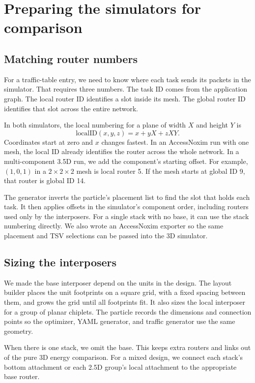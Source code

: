 \documentclass[12pt,a4paper]{article}
\begin{document}
\clearpage
\section{Preparing the simulators for comparison}

\subsection{Matching router numbers}

For a traffic-table entry, we need to know where each task sends its packets in the simulator. That requires three numbers. The task ID comes from the application graph. The local router ID identifies a slot inside its mesh. The global router ID identifies that slot across the entire network.

In both simulators, the local numbering for a plane of width \(X\) and height \(Y\) is
\[
\mathrm{localID}(x,y,z)=x+yX+zXY.
\]
Coordinates start at zero and \(x\) changes fastest. In an AccessNoxim run with one mesh, the local ID already identifies the router across the whole network. In a multi-component 3.5D run, we add the component's starting offset. For example, \((1,0,1)\) in a \(2\times2\times2\) mesh is local router 5. If the mesh starts at global ID 9, that router is global ID 14.

The generator inverts the particle's placement list to find the slot that holds each task. It then applies offsets in the simulator's component order, including routers used only by the interposers. For a single stack with no base, it can use the stack numbering directly. We also wrote an AccessNoxim exporter so the same placement and TSV selections can be passed into the 3D simulator.

\subsection{Sizing the interposers}

We made the base interposer depend on the units in the design. The layout builder places the unit footprints on a square grid, with a fixed spacing between them, and grows the grid until all footprints fit. It also sizes the local interposer for a group of planar chiplets. The particle records the dimensions and connection points so the optimizer, YAML generator, and traffic generator use the same geometry.

When there is one stack, we omit the base. This keeps extra routers and links out of the pure 3D energy comparison. For a mixed design, we connect each stack's bottom attachment or each 2.5D group's local attachment to the appropriate base router.
\end{document}
